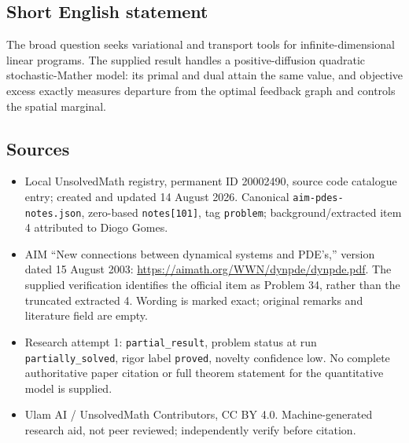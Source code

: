 \documentclass[11pt]{article}
\begin{document}
\subsection{Short English statement}
The broad question seeks variational and transport tools for infinite-dimensional linear programs. The supplied result handles a positive-diffusion quadratic stochastic-Mather model: its primal and dual attain the same value, and objective excess exactly measures departure from the optimal feedback graph and controls the spatial marginal.
\subsection{Sources}
\begin{itemize}
\item Local UnsolvedMath registry, permanent ID 20002490, source code catalogue entry; created and updated 14 August 2026. Canonical \texttt{aim-pdes-notes.json}, zero-based \texttt{notes[101]}, tag \texttt{problem}; background/extracted item 4 attributed to Diogo Gomes.
\item AIM ``New connections between dynamical systems and PDE's,'' version dated 15 August 2003: \url{https://aimath.org/WWN/dynpde/dynpde.pdf}. The supplied verification identifies the official item as Problem 34, rather than the truncated extracted 4. Wording is marked exact; original remarks and literature field are empty.
\item Research attempt 1: \texttt{partial\_result}, problem status at run \texttt{partially\_solved}, rigor label \texttt{proved}, novelty confidence low. No complete authoritative paper citation or full theorem statement for the quantitative model is supplied.
\item Ulam AI / UnsolvedMath Contributors, CC BY 4.0. Machine-generated research aid, not peer reviewed; independently verify before citation.
\end{itemize}
\end{document}
